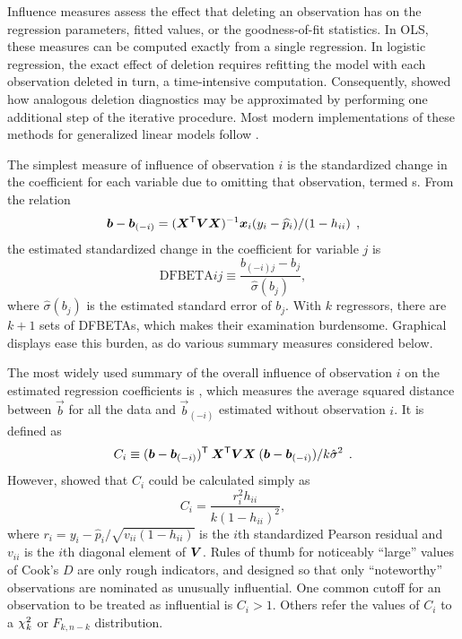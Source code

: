 \documentclass[11pt]{book}\usepackage[]{graphicx}\usepackage[]{color}
\begin{document}
Influence measures assess the effect that deleting an
observation has on the regression parameters, fitted values, or the
goodness-of-fit statistics.  In OLS, these measures
can be computed exactly from a single regression.
In logistic regression, the exact effect of deletion
requires refitting the model with each observation deleted in turn,
a time-intensive computation.
Consequently, \citet{Pregibon:81} showed how analogous deletion
diagnostics may be approximated by performing one additional step
of the iterative procedure.  Most modern implementations of these
methods for generalized linear models follow \citet{Williams:87}.

The simplest measure of influence of observation $i$ is the standardized change in the coefficient for each variable due to omitting that observation,
termed s.  From the relation \citep[p. 716]{Pregibon:81}
\begin{equation*}%
 \vec{b} -  \vec{b}_{(-i)} = (\mat{X}\trans \mat{V} \mat{X})^{-1} \vec{x}_i (y_i - \widehat{p}_i) / (1 - h_{ii})
 \comma
\end{equation*}
the estimated standardized change in the coefficient for variable $j$ is
\begin{equation}\label{eq:dfbeta}
 \mbox{DFBETA}{ij} \equiv \frac{b_{(-i)j} -  b_j } {\hat{\sigma} (b_j)}
 \comma
\end{equation}
where $\hat{\sigma} (b_j)$ is the estimated standard error of $b_j$.
With $k$ regressors, there are $k+1$ sets of DFBETAs, which makes their examination burdensome.
Graphical displays ease this burden, as do various summary measures
considered below.

The most widely used summary of the
overall influence of observation $i$ on the estimated regression
coefficients is , which measures
the average squared distance between $\vec{b}$ for all the data and
$\vec{b}_{(-i)}$ estimated without observation $i$.
It is defined as 
\begin{equation*}%
C_i \equiv ( \vec{b} - \vec{b}_{(-i)} )\trans \:
    \mat{X}\trans \mat{V} \mat{X} \:
     ( \vec{b} - \vec{b}_{(-i)} ) / k \hat{\sigma}^2
    \period
\end{equation*}
However, \citet{Pregibon:81} showed that $C_i$ could be calculated
simply as
\begin{equation}\label{eq:cookd2}
 C_i = \frac{r_i^2 h_{ii}} {k (1-h_{ii} )^2}
 \comma
\end{equation}
where $r_i = y_i - \hat{p}_i / \sqrt{v_{ii} (1-h_{ii})}$ is the
$i$th standardized Pearson residual and $v_{ii}$ is the
$i$th diagonal element of $\bm{V}$.
Rules of thumb for noticeably ``large'' values of Cook's $D$ 
are only rough indicators, and designed so that only
``noteworthy'' observations are nominated as unusually influential.
One common cutoff for an observation to be treated as influential
is $C_i > 1$. Others refer the values of $C_i$ to a 
$\chi^2_k$ or $F_{k, n-k}$ distribution.
\end{document}
